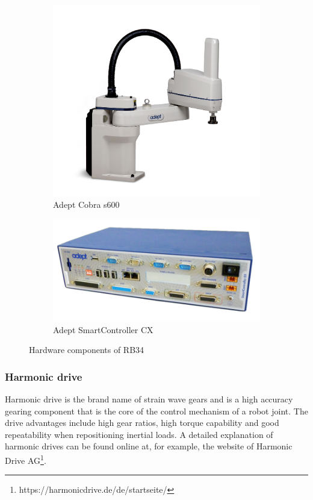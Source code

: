 \begin{figure}[ht]
\centering
\begin{subfigure}[b]{0.49\textwidth}
\includegraphics[width=\textwidth]{Figures/Cobra-600}
\caption{Adept Cobra s600}
\label{fig:Cobra s600}
\end{subfigure}
\begin{subfigure}[b]{0.49\textwidth}
\includegraphics[width=\textwidth]{Figures/SmartController}
\caption{Adept SmartController CX}
\label{fig:SmartController}
\end{subfigure}
\caption[Relevant hardware components of RB34]{Hardware components of RB34}
\label{fig:HardwareComponents}
\end{figure}

\subsubsection{Harmonic drive} \label{Harmonic drive}
Harmonic drive is the brand name of strain wave gears and is a high accuracy gearing component that is the core of the control mechanism of a robot joint. The drive advantages include high gear ratios, high torque capability and good repeatability when repositioning inertial loads. A detailed explanation of harmonic drives can be found online at, for example, the website of Harmonic Drive AG\textsuperscript{\textregistered}\footnote{https://harmonicdrive.de/de/startseite/}.


